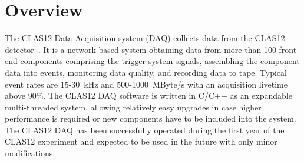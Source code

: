 \section{Overview}

The CLAS12 Data Acquisition system (DAQ) collects data from the CLAS12 detector~\cite{overview-ref}. It is a
network-based system obtaining data from more than 100 front-end components comprising the trigger system signals,
assembling the component data into events, monitoring data quality, and recording data to tape. Typical event rates are
15-30~kHz and 500-1000~MByte/s with an acquisition livetime above 90\%. The CLAS12 DAQ software is written in
C/C++ as an expandable multi-threaded system, allowing relatively easy upgrades in case higher performance is required
or new components have to be included into the system. The CLAS12 DAQ has been successfully operated during the
first year of the CLAS12 experiment and expected to be used in the future with only minor modifications.
